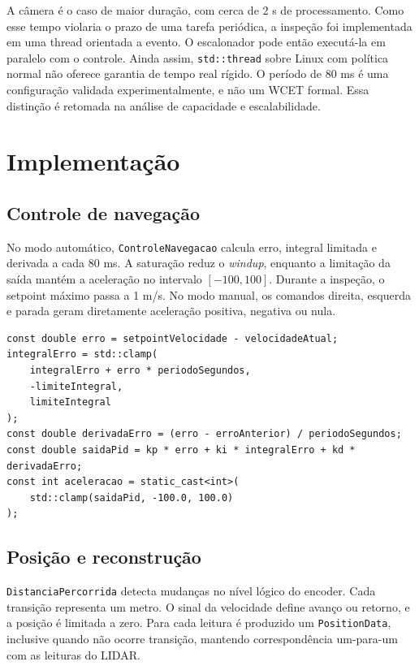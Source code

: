 \documentclass[12pt,a4paper]{article}
\begin{document}
A câmera é o caso de maior duração, com cerca de 2 s de processamento. Como esse tempo violaria o prazo de uma tarefa periódica, a inspeção foi implementada em uma thread orientada a evento. O escalonador pode então executá-la em paralelo com o controle. Ainda assim, \texttt{std::thread} sobre Linux com política normal não oferece garantia de tempo real rígido. O período de 80 ms é uma configuração validada experimentalmente, e não um WCET formal. Essa distinção é retomada na análise de capacidade e escalabilidade.

\section{Implementação}

\subsection{Controle de navegação}

No modo automático, \texttt{ControleNavegacao} calcula erro, integral limitada e derivada a cada 80 ms. A saturação reduz o \textit{windup}, enquanto a limitação da saída mantém a aceleração no intervalo $[-100,100]$. Durante a inspeção, o setpoint máximo passa a 1 m/s. No modo manual, os comandos direita, esquerda e parada geram diretamente aceleração positiva, negativa ou nula.

\begin{lstlisting}[style=cppstyle,caption={Núcleo do controlador PID.}]
const double erro = setpointVelocidade - velocidadeAtual;
integralErro = std::clamp(
    integralErro + erro * periodoSegundos,
    -limiteIntegral,
    limiteIntegral
);
const double derivadaErro = (erro - erroAnterior) / periodoSegundos;
const double saidaPid = kp * erro + ki * integralErro + kd * derivadaErro;
const int aceleracao = static_cast<int>(
    std::clamp(saidaPid, -100.0, 100.0)
);
\end{lstlisting}

\subsection{Posição e reconstrução}

\texttt{DistanciaPercorrida} detecta mudanças no nível lógico do encoder. Cada transição representa um metro. O sinal da velocidade define avanço ou retorno, e a posição é limitada a zero. Para cada leitura é produzido um \texttt{PositionData}, inclusive quando não ocorre transição, mantendo correspondência um-para-um com as leituras do LIDAR.
\end{document}
